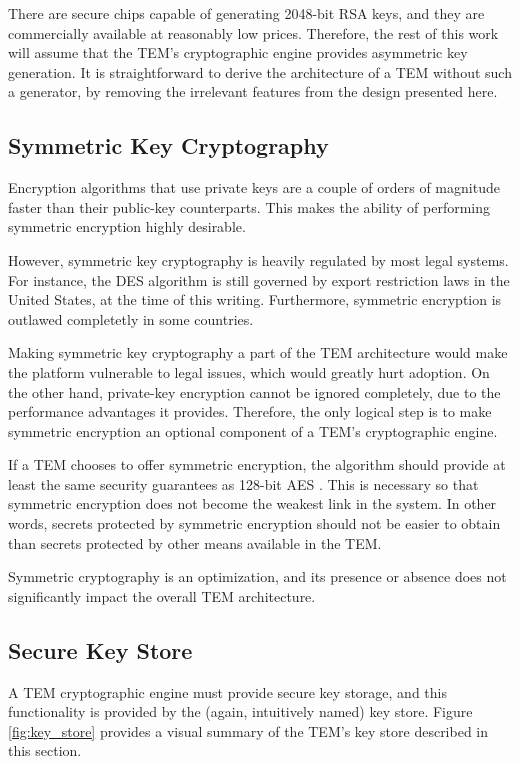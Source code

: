 There are secure chips capable of generating 2048-bit RSA keys, and they are
commercially available at reasonably low prices. Therefore, the rest of this
work will assume that the TEM's cryptographic engine provides asymmetric key
generation. It is straightforward to derive the architecture of a TEM without
such a generator, by removing the irrelevant features from the design presented
here.

\subsection{Symmetric Key Cryptography}\label{arch:symmetric_crypto}
Encryption algorithms that use private keys are a couple of orders of
magnitude faster than their public-key counterparts. This makes the
ability of performing symmetric encryption highly desirable.

However, symmetric key cryptography is heavily regulated by most legal systems.
For instance, the DES algorithm \cite{coppersmith1994} is still governed by
export restriction laws in the United States, at the time of this writing.
Furthermore, symmetric encryption is outlawed completetly in some countries. 

Making symmetric key cryptography a part of the TEM architecture would make the
platform vulnerable to legal issues, which would greatly hurt adoption. On the
other hand, private-key encryption cannot be ignored completely, due to the
performance advantages it provides. Therefore, the only logical step is to make
symmetric encryption an optional component of a TEM's cryptographic engine.

If a TEM chooses to offer symmetric encryption, the algorithm should provide at
least the same security guarantees as 128-bit AES \cite{daemen1999apr}. This is
necessary so that symmetric encryption does not become the weakest link in the
system. In other words, secrets protected by symmetric encryption should not be
easier to obtain than secrets protected by other means available in the TEM.

Symmetric cryptography is an optimization, and its presence or absence does
not significantly impact the overall TEM architecture.

\subsection{Secure Key Store}\label{arch:key_store}
A TEM cryptographic engine must provide secure key storage, and this
functionality is provided by the (again, intuitively named) key store. Figure
\ref{fig:key_store} provides a visual summary of the TEM's key store described
in this section.

